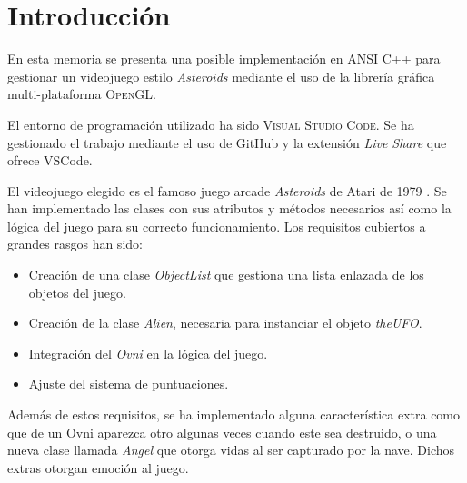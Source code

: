 \section{Introducción}

En esta memoria se presenta una posible implementación en ANSI C++ para gestionar un videojuego estilo \emph{Asteroids} mediante el uso de la librería gráfica multi-plataforma \textsc{OpenGL}.

El entorno de programación utilizado ha sido \textsc{Visual Studio Code}. Se ha gestionado el trabajo mediante el uso de GitHub y la extensión \emph{Live Share} que ofrece VSCode.

El videojuego elegido es el famoso juego arcade \emph{Asteroids} de Atari de 1979 \cite{wiki}. Se han implementado las clases con sus atributos y métodos necesarios así como la lógica del juego para su correcto funcionamiento.
Los requisitos cubiertos a grandes rasgos han sido:
\begin{itemize}
    \item Creación de una clase \emph{ObjectList} que gestiona una lista enlazada de los objetos del juego.
    \item Creación de la clase \emph{Alien}, necesaria para instanciar el objeto \emph{theUFO}.
    \item Integración del \emph{Ovni} en la lógica del juego.
    \item Ajuste del sistema de puntuaciones.
\end{itemize}

Además de estos requisitos, se ha implementado alguna característica extra como que de un Ovni aparezca otro algunas veces cuando este sea destruido, o una nueva clase llamada \emph{Angel} que otorga vidas al ser capturado por la nave. Dichos extras otorgan emoción al juego.
